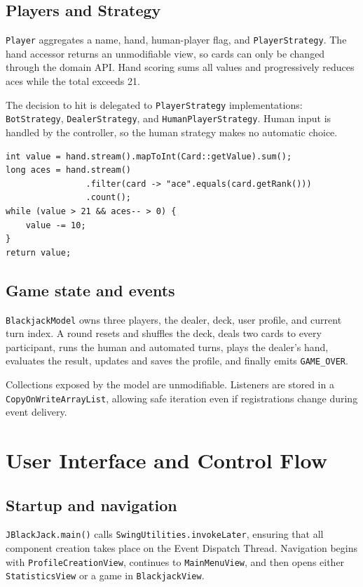 \documentclass[11pt,a4paper]{report}
\newcommand{\code}[1]{\nolinkurl{#1}}
\begin{document}
\section{Players and Strategy}

\code{Player} aggregates a name, hand, human-player flag, and
\code{PlayerStrategy}. The hand accessor returns an unmodifiable view, so cards can
only be changed through the domain API. Hand scoring sums all values and progressively
reduces aces while the total exceeds 21.

The decision to hit is delegated to \code{PlayerStrategy} implementations:
\code{BotStrategy}, \code{DealerStrategy}, and \code{HumanPlayerStrategy}. Human
input is handled by the controller, so the human strategy makes no automatic choice.

\begin{lstlisting}[style=java,caption={Core algorithm for scoring flexible aces.}]
int value = hand.stream().mapToInt(Card::getValue).sum();
long aces = hand.stream()
                .filter(card -> "ace".equals(card.getRank()))
                .count();
while (value > 21 && aces-- > 0) {
    value -= 10;
}
return value;
\end{lstlisting}

\section{Game state and events}

\code{BlackjackModel} owns three players, the dealer, deck, user profile, and current
turn index. A round resets and shuffles the deck, deals two cards to every participant,
runs the human and automated turns, plays the dealer's hand, evaluates the result,
updates and saves the profile, and finally emits \code{GAME_OVER}.

Collections exposed by the model are unmodifiable. Listeners are stored in a
\code{CopyOnWriteArrayList}, allowing safe iteration even if registrations change
during event delivery.

\chapter{User Interface and Control Flow}

\section{Startup and navigation}

\code{JBlackJack.main()} calls \code{SwingUtilities.invokeLater}, ensuring that all
component creation takes place on the Event Dispatch Thread. Navigation begins with
\code{ProfileCreationView}, continues to \code{MainMenuView}, and then opens either
\code{StatisticsView} or a game in \code{BlackjackView}.
\end{document}
